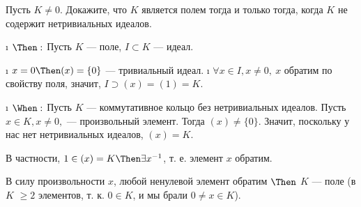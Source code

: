 \begin{problem}[17(3.15)]
Пусть $K \neq 0$. Докажите, что $K$ является полем тогда и только тогда, когда $K$ не содержит нетривиальных идеалов.
\end{problem}
\begin{solution}
\begin{itemize}
\i
  \(\Then:\)
  Пусть $K$ --- поле, \(I \subset K\) --- идеал.

  \begin{itemize}
  \tightlist
  \i
    \(x = 0 \Then (x) = \{0\}\) --- тривиальный идеал.
  \i
    \(\forall x \in I, x \ne 0, \ x\) обратим по свойству поля, значит, \(I \supset (x) = (1) = K\).
  \end{itemize}
\i
  \(\When:\)
  Пусть $K$ --- коммутативное кольцо без нетривиальных идеалов. Пусть \(x \in K, x \ne 0,\) --- произвольный элемент. Тогда \((x) \ne \{0\}\). Значит, поскольку у нас нет нетривиальных идеалов, \((x) = K\).

  В частности, \(1 \in (x) = K \Then \exists x^{-1}\), т. е. элемент $x$ обратим.

  В силу произвольности $x$, любой ненулевой элемент обратим \(\Then\) $K$ --- поле (в $K$ \(\ge 2\) элементов, т. к. \(0 \in K\), и мы брали \(0\ne x \in K\)).
\end{itemize}

\end{solution}

